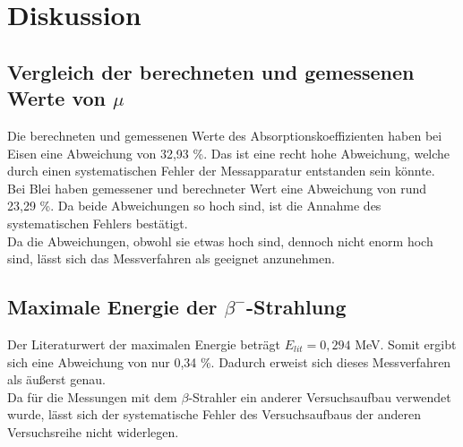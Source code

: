 \section{Diskussion}
\label{sec:Diskussion}
\subsection{Vergleich der berechneten und gemessenen Werte von \texorpdfstring{$\mu$}{Absorptionskoeffizient}}

Die berechneten und gemessenen Werte des Absorptionskoeffizienten haben bei Eisen eine Abweichung von 32,93 \%. 
Das ist eine recht hohe Abweichung, welche durch einen systematischen Fehler der Messapparatur
entstanden sein könnte.\\
Bei Blei haben gemessener und berechneter Wert eine Abweichung von rund 23,29 \%. Da beide Abweichungen so hoch sind,
ist die Annahme des systematischen Fehlers bestätigt.\\
Da die Abweichungen, obwohl sie etwas hoch sind, dennoch nicht enorm hoch sind, lässt sich das Messverfahren
als geeignet anzunehmen.\\

\subsection{Maximale Energie der \texorpdfstring{$\beta^-$}{Beta}-Strahlung}

Der Literaturwert der maximalen Energie beträgt $E_{lit} = 0,294 $ MeV. Somit ergibt sich eine Abweichung von nur
0,34 \%. Dadurch erweist sich dieses Messverfahren als äußerst genau.\\
Da für die Messungen mit dem $\beta$-Strahler ein anderer Versuchsaufbau verwendet wurde, lässt sich der systematische
Fehler des Versuchsaufbaus der anderen Versuchsreihe nicht widerlegen.
